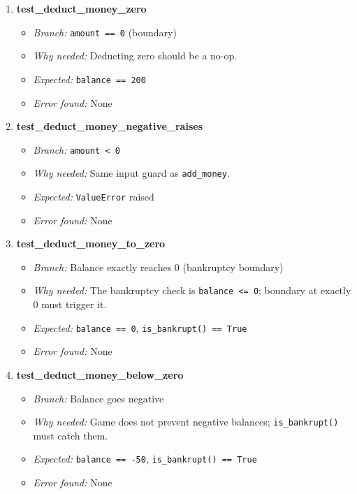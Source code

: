 \documentclass{article}
\begin{document}
\begin{enumerate}[label=\textbf{TC\arabic*.}]
  \item \textbf{test\_deduct\_money\_zero}
  \begin{itemize}[noitemsep]
    \item \textit{Branch:} \texttt{amount == 0} (boundary)
    \item \textit{Why needed:} Deducting zero should be a no-op.
    \item \textit{Expected:} \texttt{balance == 200}
    \item \textit{Error found:} None
  \end{itemize}

  \item \textbf{test\_deduct\_money\_negative\_raises}
  \begin{itemize}[noitemsep]
    \item \textit{Branch:} \texttt{amount < 0}
    \item \textit{Why needed:} Same input guard as \texttt{add\_money}.
    \item \textit{Expected:} \texttt{ValueError} raised
    \item \textit{Error found:} None
  \end{itemize}

  \item \textbf{test\_deduct\_money\_to\_zero}
  \begin{itemize}[noitemsep]
    \item \textit{Branch:} Balance exactly reaches 0 (bankruptcy boundary)
    \item \textit{Why needed:} The bankruptcy check is \texttt{balance <= 0}; boundary at exactly 0 must trigger it.
    \item \textit{Expected:} \texttt{balance == 0}, \texttt{is\_bankrupt() == True}
    \item \textit{Error found:} None
  \end{itemize}

  \item \textbf{test\_deduct\_money\_below\_zero}
  \begin{itemize}[noitemsep]
    \item \textit{Branch:} Balance goes negative
    \item \textit{Why needed:} Game does not prevent negative balances; \texttt{is\_bankrupt()} must catch them.
    \item \textit{Expected:} \texttt{balance == -50}, \texttt{is\_bankrupt() == True}
    \item \textit{Error found:} None
  \end{itemize}

\end{enumerate}
\end{document}
